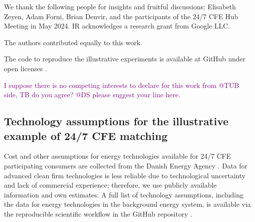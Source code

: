 \documentclass[pdflatex,sn-basic, Numbered]{sn-jnl}%
\theoremstyle{thmstyleone}%
\theoremstyle{thmstyletwo}%
\theoremstyle{thmstylethree}%
\newcommand{\comment}[1]{\textcolor{purple}{#1}}
\begin{document}

\backmatter

 We thank the following people for insights and fruitful discussions: Elisabeth Zeyen, Adam Forni, Brian Denvir, and the participants of the 24/7 CFE Hub Meeting in May 2024. IR acknowledges a research grant from Google LLC.

 The authors contributed equally to this work.

 The code to reproduce the illustrative experiments is available at GitHub under open licenses \cite{code247CFE}.

 \comment{I suppose there is no competing interests to declare for this work from @TUB side, TB do you agree? @DS please suggest your line here.}




\FloatBarrier
\newpage 

\subsection*{Technology assumptions for the illustrative example of 24/7 CFE matching}
\label{sec:annex}

Cost and other assumptions for energy technologies available for 24/7 CFE participating consumers are collected from the Danish Energy Agency \cite{DEA-technologydata}.
Data for advanced clean firm technologies is less reliable due to technological uncertainty and lack of commercial experience; therefore, we use publicly available information and own estimates.
A full list of technology assumptions, including the data for energy technologies in the background energy system, is available via the reproducible scientific workflow in the GitHub repository \cite{code247CFE}.
\end{document}

